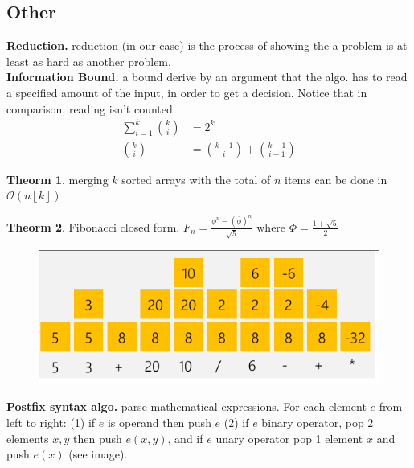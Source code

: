 \documentclass[]{article}
\newcommand\compactsection   [1]        {\vspace{-10pt}\section{#1}\vspace{-5pt}}
\theoremstyle{definition}
\newtheorem{Theorem}{\color{theoColor}Theorm}
\newcommand\theo  [1] {\begin{Theorem}#1\end{Theorem}}
\newcommand\oc    {\mathcal{O}}
\newcommand\rf    {\right\rfloor}
\newcommand\lf    {\left\lfloor}
\newcommand\floor [1] {\lf #1 \rf}
\begin{document}
\begin{multicols}{4}
		
		\compactsection{Other}
		\textbf{Reduction. }reduction (in our case) is the process of showing the a problem is at least as hard as another problem. \\
		\textbf{Information Bound. }a bound derive by an argument that the algo. has to read a specified amount of the input, in order to get a decision. Notice that in comparison, reading isn't counted. 
		\vspace{-13pt}\begin{align*}
			\sum_{i = 1}^{k}\binom{k}{i} &= 2^{k} \\
			\binom{k}{i} &= \binom{k - 1}{i} + \binom{k - 1}{i - 1}
		\end{align*}\vspace{-13pt}
		\theo{merging $k$ sorted arrays with the total of $n$ items can be done in $\oc(n \floor{k})$}
		\theo{Fibonacci closed form. $\textstyle F_n = \frac{\phi^{n} - (\bar \phi)^{n}}{\sqrt 5}$ where $\textstyle \Phi = \frac{1 + \sqrt 5}{2}$}
		\begin{figure}
			\includegraphics[width=\linewidth]{images/postfix}
		\end{figure}
		\textbf{Postfix syntax algo. }parse mathematical expressions. For each element $e$ from left to right: (1) if $e$ is operand then push $e$ (2) if $e$ binary operator, pop 2 elements $x, y$ then push $e(x, y)$, and if $e$ unary operator pop 1 element $x$ and push $e(x)$ (see image). 
		

\end{multicols}
\end{document}

